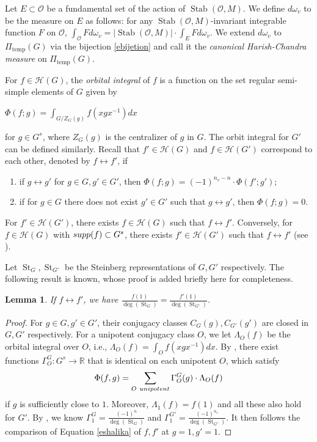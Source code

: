 \documentclass[11pt]{article}
\theoremstyle{plain}
\newtheorem{lemma}[theorem]{Lemma}
\theoremstyle{remark}
\theoremstyle{definition}
\DeclareMathOperator{\St}{St}
\DeclareMathOperator{\tp}{temp}
\DeclareMathOperator{\Stb}{Stab}
\begin{document}
Let $E\subset \mathcal{O}$ be a fundamental set of the action of $\Stb(\mathcal{O},M)$. 
We define $d \omega_v$ to be the measure on $E$ as follows: for any $\Stb(\mathcal{O},M)$-invariant integrable function $F$ on $\mathcal{O}$, $\int_{\mathcal{O}}Fd\omega_v=|\Stb(\mathcal{O},M)|\cdot \int_{E}Fd \omega_v$. 
We extend $d \omega_v$ to $\Pi_{\tp}(G)$ via the bijection \eqref{ebijetion} and call it the {\it canonical Harish-Chandra measure} on  $\Pi_{\tp}(G)$. 


For $f\in \mathcal{H}(G)$, the {\it orbital integral} of $f$ is a function on the set regular semi-simple elements of $G$ given by
\begin{center}
    $\Phi(f;g)=\int_{G/Z_G(g)}f(xgx^{-1})dx$
\end{center} 
for $g\in G^s$, where $Z_G(g)$ is the centralizer of $g$ in $G$. 
The orbit integral for $G'$ can be defined similarly. 
Recall that  $f'\in \mathcal{H}(G)$ and  $f\in \mathcal{H}(G')$ correspond to each other, denoted by $f\leftrightarrow f'$, if
\begin{enumerate}
    \item if $g\leftrightarrow g'$ for $g\in G,g'\in G'$, then $\Phi(f;g)=(-1)^{n_v-n}\cdot\Phi(f';g')$;
    \item if for $g\in G$ there does not exist $g'\in G'$ such that $g\leftrightarrow g'$, then $\Phi(f;g)=0$. 
\end{enumerate}
For $f'\in \mathcal{H}(G')$, there exists $f\in \mathcal{H}(G)$ such that $f\leftrightarrow f'$.  Conversely, for $f\in \mathcal{H}(G)$ with ${\rm supp}(f)\subset G^s$, there exists $f'\in \mathcal{H}(G')$ such that $f\leftrightarrow f'$ (see \cite[\S 2.5]{Badu2018}). 

Let $\St_G,\St_{G'}$ be the Steinberg representations of $G,G'$ respectively. 
The following result is known, whose proof is added briefly here for completeness.   
\begin{lemma}\label{lf1St}
If $f\leftrightarrow f'$, we have $\frac{f(1)}{\deg(\St_G)}=\frac{f'(1)}{\deg(\St_{G'})}$. 
\end{lemma}
\begin{proof}
For $g\in G,g'\in G'$, their conjugacy classes $C_{G}(g),C_{G'}(g')$ are closed in $G,G'$ respectively. 
For a unipotent conjugacy class $O$, we let $\Lambda_{O}(f)$ be the orbital integral over $O$, i.e., $\Lambda_{O}(f)=\int_{O}f(xgx^{-1})dx$. 
By \cite[Theorem 2.1.1]{Shalika72}, 
there exist functions $\Gamma^G_O\colon G^s\to \mathbb{R}$ that is identical on each unipotent $O$, which satisfy
\begin{equation}\label{eshalika}
    \Phi(f,g)=\sum_{O{\rm~unipotent}} \Gamma_{O }^{G}(g)\cdot \Lambda_{O}(f)
\end{equation} 
if $g$ is sufficiently close to $1$.  
Moreover, $\Lambda_{1}(f)=f(1)$ and all these also hold for $G'$. 
By \cite[Theorem]{Rog80}, we know $\Gamma_1^G=\frac{(-1)^{n}}{\deg(\St_G)}$ and $\Gamma_1^{G'}=\frac{(-1)^{n_v}}{\deg(\St_{G'})}$. 
It then follows the comparison of Equation \eqref{eshalika} of $f,f'$ at $g=1,g'=1$. 
\end{proof}
\end{document}
